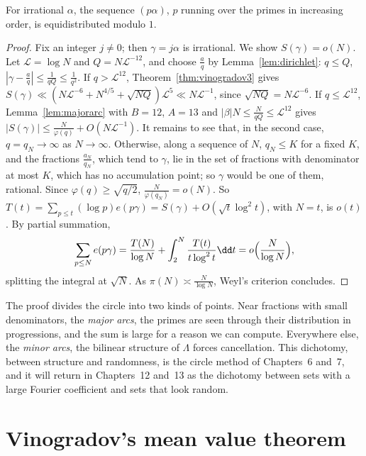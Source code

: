 \begin{corollary}[Vinogradov, 1937]\label{cor:palpha}
For irrational $\alpha$, the sequence $(p\alpha)$, $p$ running over the primes in increasing order, is equidistributed modulo $1$.
\end{corollary}
\begin{proof}
Fix an integer $j\ne0$; then $\gamma=j\alpha$ is irrational. We show $S(\gamma)=o(N)$. Let $\mathcal L=\log N$ and $Q=N\mathcal L^{-12}$, and choose $\frac aq$ by Lemma~\ref{lem:dirichlet}: $q\le Q$, $|\gamma-\frac aq|\le\frac1{qQ}\le\frac1{q^2}$. If $q>\mathcal L^{12}$, Theorem~\ref{thm:vinogradov3} gives $S(\gamma)\ll(N\mathcal L^{-6}+N^{4/5}+\sqrt{NQ})\mathcal L^5\ll N\mathcal L^{-1}$, since $\sqrt{NQ}=N\mathcal L^{-6}$. If $q\le\mathcal L^{12}$, Lemma~\ref{lem:majorarc} with $B=12$, $A=13$ and $|\beta|N\le\frac N{qQ}\le\mathcal L^{12}$ gives $|S(\gamma)|\le\frac N{\varphi(q)}+O(N\mathcal L^{-1})$.
It remains to see that, in the second case, $q=q_N\to\infty$ as $N\to\infty$. Otherwise, along a sequence of $N$, $q_N\le K$ for a fixed $K$, and the fractions $\frac{a_N}{q_N}$, which tend to $\gamma$, lie in the set of fractions with denominator at most $K$, which has no accumulation point; so $\gamma$ would be one of them, rational. Since $\varphi(q)\ge\sqrt{q/2}$, $\frac N{\varphi(q_N)}=o(N)$.
So $T(t)=\sum_{p\le t}(\log p)e(p\gamma)=S(\gamma)+O(\sqrt t\log^2t)$, with $N=t$, is $o(t)$. By partial summation,
\[
\sum_{p\le N}e(p\gamma)=\frac{T(N)}{\log N}+\int_2^N\frac{T(t)}{t\log^2t}\dd t=o\Bigl(\frac N{\log N}\Bigr),
\]
splitting the integral at $\sqrt N$. As $\pi(N)\asymp\frac N{\log N}$, Weyl's criterion concludes.
\end{proof}

\begin{beauty}
The proof divides the circle into two kinds of points. Near fractions with small denominators, the \emph{major arcs}, the primes are seen through their distribution in progressions, and the sum is large for a reason we can compute. Everywhere else, the \emph{minor arcs}, the bilinear structure of $\Lambda$ forces cancellation. This dichotomy, between structure and randomness, is the circle method of Chapters~6 and~7, and it will return in Chapters~12 and~13 as the dichotomy between sets with a large Fourier coefficient and sets that look random.
\end{beauty}

\section{Vinogradov's mean value theorem}

